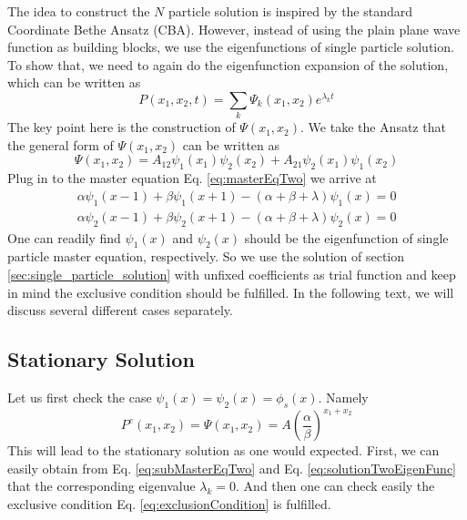 \documentclass[12pt,a4paper]{article}
\begin{document}
The idea to construct the $N$ particle solution is inspired by the standard
Coordinate Bethe Ansatz (CBA). However, instead of using the plain plane wave
function as building blocks, we use the eigenfunctions of single particle
solution. To show that, we need to again do the eigenfunction expansion of the
solution, which can be written as 
\begin{equation}
    \label{eq:solutionTwo}
    P(x_1, x_2, t) = \sum_{k} \Psi_{k}(x_1, x_2) e^{\lambda_k t}
\end{equation}
The key point here is the construction of $\Psi(x_1, x_2)$. We take the Ansatz
that the general form of $\Psi(x_1, x_2)$ can be written as
\begin{equation}
    \label{eq:solutionTwoEigenFunc}
    \Psi(x_1, x_2) = A_{12}\psi_1(x_1)\psi_2(x_2) +
    A_{21}\psi_2(x_1)\psi_1(x_2)
\end{equation}
Plug in to the master equation Eq. \eqref{eq:masterEqTwo} we arrive at
\begin{subequations}
    \label{eq:subMasterEqTwo}
    \begin{eqnarray}
        \alpha\psi_1(x-1) + \beta\psi_1(x+1) - 
        (\alpha+\beta+\lambda)\psi_1(x) = 0 \\
        \alpha\psi_2(x-1) + \beta\psi_2(x+1) - 
        (\alpha+\beta+\lambda)\psi_2(x) = 0
    \end{eqnarray}
\end{subequations}
One can readily find $\psi_1(x)$ and $\psi_2(x)$ should be the eigenfunction of
single particle master equation, respectively. So we use the solution of
section \ref{sec:single_particle_solution} with unfixed coefficients as trial
function and keep in mind the exclusive condition should be fulfilled. In the
following text, we will discuss several different cases separately.

\subsection{Stationary Solution}
\label{sub:stationary_soution}
Let us first check the case $\psi_1(x) = \psi_2(x) = \phi_s(x)$. Namely
\begin{equation}
    \label{eq:stationaryTwo}
    P^e(x_1, x_2) = \Psi(x_1, x_2) = A \left(\frac{\alpha}{\beta}\right)^{x_1+x_2}
\end{equation}
This will lead to the stationary solution as one would expected. First, we can
easily obtain from Eq. \eqref{eq:subMasterEqTwo} and Eq.
\eqref{eq:solutionTwoEigenFunc} that the corresponding eigenvalue $\lambda_k=0$.
And then one can check easily the exclusive condition Eq.
\eqref{eq:exclusionCondition} is fulfilled. 
\end{document}
